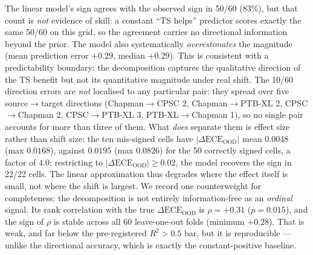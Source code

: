\documentclass[review,12pt,nonatbib]{elsarticle}
\begin{document}
The linear model's sign agrees with the observed sign in 50/60
(83\%), but that count is \emph{not} evidence of skill: a constant
``TS helps'' predictor scores exactly the same 50/60 on this grid, so
the agreement carries no directional information beyond the prior. The
model also systematically \emph{overestimates} the magnitude (mean
prediction error $+0.29$, median $+0.29$). This is consistent with a
predictability boundary: the decomposition captures the qualitative
direction of the TS benefit but not its quantitative magnitude under
real shift. The 10/60 direction errors are \emph{not} localised to any
particular pair: they spread over five source$\rightarrow$target
directions (Chapman$\rightarrow$CPSC 2, Chapman$\rightarrow$PTB-XL 2,
CPSC$\rightarrow$Chapman 2, CPSC$\rightarrow$PTB-XL 3,
PTB-XL$\rightarrow$Chapman 1), so no single pair accounts for more than
three of them. What \emph{does} separate them is effect size rather than
shift size: the ten mis-signed cells have
$|\Delta\text{ECE}_{\text{OOD}}|$ mean $0.0048$ (max $0.0168$), against
$0.0195$ (max $0.0826$) for the 50 correctly signed cells, a factor of
$4.0$; restricting to $|\Delta\text{ECE}_{\text{OOD}}| \geq 0.02$, the
model recovers the sign in 22/22 cells. The linear approximation thus
degrades where the effect itself is small, not where the shift is
largest. We record one counterweight for completeness: the
decomposition is not entirely information-free as an \emph{ordinal}
signal. Its rank correlation with the true
$\Delta\text{ECE}_{\text{OOD}}$ is $\rho = +0.31$ ($p = 0.015$), and the
sign of $\rho$ is stable across all 60 leave-one-out folds (minimum
$+0.28$). That is weak, and far below the pre-registered $R^2 > 0.5$
bar, but it is reproducible --- unlike the directional accuracy, which
is exactly the constant-positive baseline.
\end{document}
